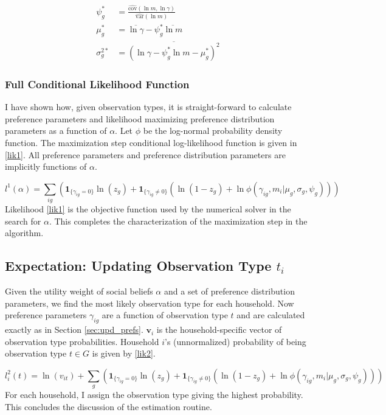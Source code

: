\documentclass[12pt]{article}
\begin{document}
\begin{align}
    \psi_g^* &= \frac{\hat{\mbox{cov}}(\ln m, \ln \gamma)}{\hat{\mbox{var}}(\ln m)} \nonumber \\
    \mu_g^* &= \overline{\ln \gamma} - \psi_g^* \overline{\ln m} \nonumber \\
    \sigma_g^{2*} &= \overline{\left(\ln \gamma - \psi_g^* \ln m - \mu_g^*\right)^2}
\end{align}

\subsubsection{Full Conditional Likelihood Function}

I have shown how, given observation types, it is straight-forward to calculate preference parameters and likelihood maximizing preference distribution parameters as a function of $\alpha$.  Let $\phi$ be the log-normal probability density function.   The maximization step conditional log-likelihood function is given in \eqref{lik1}.  All preference parameters and preference distribution parameters are implicitly functions of $\alpha$.

\begin{equation}
	\label{lik1}
    l^1(\alpha) = \sum_{ig} \left(\mathbf{1}_{\{\gamma_{ig} = 0\}}\ln\left(z_g\right) + \mathbf{1}_{\{\gamma_{ig} \neq 0\}} \left(\ln\left(1 - z_g\right)+\ln \phi(\gamma_{ig},m_i|\mu_g,\sigma_g,\psi_g)\right)\right)
\end{equation}
Likelihood \eqref{lik1} is the objective function used by the numerical solver in the search for $\alpha$.  This completes the characterization of the maximization step in the algorithm.

\subsection{Expectation: Updating Observation Type $t_i$} 

Given the utility weight of social beliefs $\alpha$ and a set of preference distribution parameters, we find the most likely observation type for each household. Now preference parameters $\gamma_{ig}$ are a function of observation type $t$ and are calculated exactly as in Section \ref{sec:upd_prefs}. $\mathbf{v}_i$ is the household-specific vector of observation type probabilities.  Household $i$'s (unnormalized) probability of being observation type $t \in G$ is given by \eqref{lik2}.

\begin{equation}
    \label{lik2}
    l_i^2(t) = \ln(v_{it}) + \sum_{g} \left(\mathbf{1}_{\{\gamma_{ig} = 0\}}\ln\left(z_g\right) + \mathbf{1}_{\{\gamma_{ig} \neq 0\}} \left(\ln\left(1-z_g\right)+\ln \phi(\gamma_{ig}, m_i|\mu_g,\sigma_g,\psi_g)\right)\right)
\end{equation}
For each household, I assign the observation type giving the highest probability.  This concludes the discussion of the estimation routine.
\end{document}
